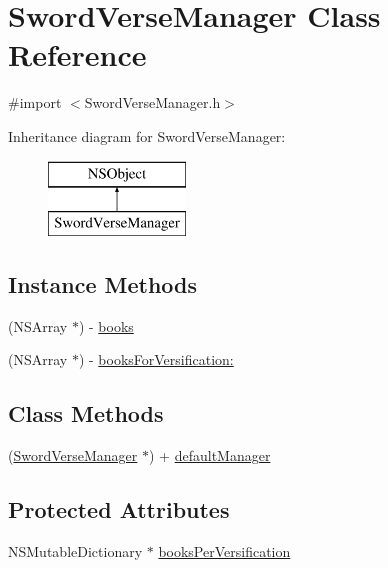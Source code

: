 \hypertarget{interface_sword_verse_manager}{\section{Sword\-Verse\-Manager Class Reference}
\label{interface_sword_verse_manager}
}


{\ttfamily \#import $<$Sword\-Verse\-Manager.\-h$>$}

Inheritance diagram for Sword\-Verse\-Manager\-:\begin{figure}[H]
\begin{center}
\leavevmode
\includegraphics[height=2.000000cm]{interface_sword_verse_manager}
\end{center}
\end{figure}
\subsection*{Instance Methods}
\begin{DoxyCompactItemize}
\item 
(N\-S\-Array $\ast$) -\/ \hyperlink{interface_sword_verse_manager_a8000a9e4a370b324c548bb216f2eaa45}{books}
\item 
(N\-S\-Array $\ast$) -\/ \hyperlink{interface_sword_verse_manager_ab44cd8299343363524249fb918fdc5a8}{books\-For\-Versification\-:}
\end{DoxyCompactItemize}
\subsection*{Class Methods}
\begin{DoxyCompactItemize}
\item 
(\hyperlink{interface_sword_verse_manager}{Sword\-Verse\-Manager} $\ast$) + \hyperlink{interface_sword_verse_manager_a7694b1edc70f78b4a1287a742d2cd8bd}{default\-Manager}
\end{DoxyCompactItemize}
\subsection*{Protected Attributes}
\begin{DoxyCompactItemize}
\item 
N\-S\-Mutable\-Dictionary $\ast$ \hyperlink{interface_sword_verse_manager_a8db39dd937ba18fc1560ff8db1780b5e}{books\-Per\-Versification}
\end{DoxyCompactItemize}


